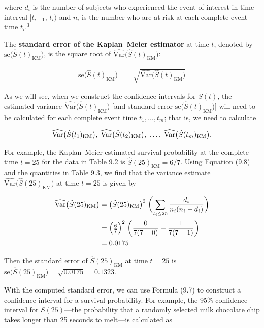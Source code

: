 \documentclass[
]{report}
\begin{document}
where \(d_i\) is the number of subjects who experienced the event of interest in time interval \([t_{i-1},\,t_i)\) and \(n_i\) is the number who are at risk at each complete event time \(t_i\).\(^3\)

The \textbf{standard error of the Kaplan--Meier estimator} at time \(t\), denoted by \(\mathrm{se}\bigl(\hat S(t)_{\mathrm{KM}}\bigr)\), is the square root of \(\widehat{\mathrm{Var}}\bigl(\hat S(t)_{\mathrm{KM}}\bigr)\):

\begin{align}
\mathrm{se}\bigl(\hat S(t)_{\mathrm{KM}}\bigr)
&= \sqrt{\widehat{\mathrm{Var}}\bigl(\hat S(t)_{\mathrm{KM}}\bigr)}
\tag{9.9}
\end{align}

As we will see, when we construct the confidence intervals for \(S(t)\), the estimated variance \(\widehat{\mathrm{Var}}\bigl(\hat S(t)_{\mathrm{KM}}\bigr)\) {[}and standard error \(\mathrm{se}\bigl(\hat S(t)_{\mathrm{KM}}\bigr)\){]} will need to be calculated for each complete event time \(t_1,\dots,t_m\); that is, we need to calculate

\begin{align}
\widehat{\mathrm{Var}}\bigl(\hat S(t_1)_{\mathrm{KM}}\bigr),\;\widehat{\mathrm{Var}}\bigl(\hat S(t_2)_{\mathrm{KM}}\bigr),\;\dots,\;\widehat{\mathrm{Var}}\bigl(\hat S(t_m)_{\mathrm{KM}}\bigr).\notag
\end{align}

For example, the Kaplan--Meier estimated survival probability at the complete time \(t=25\) for the data in Table 9.2 is \(\hat S(25)_{\mathrm{KM}} = 6/7\). Using Equation (9.8) and the quantities in Table 9.3, we find that the variance estimate \(\widehat{\mathrm{Var}}\bigl(\hat S(25)_{\mathrm{KM}}\bigr)\) at time \(t=25\) is given by

\begin{align}
\widehat{\mathrm{Var}}\bigl(\hat S(25)_{\mathrm{KM}}\bigr)
&= \bigl(\hat S(25)_{\mathrm{KM}}\bigr)^2 \;\biggl(\sum_{t_i \le 25}\frac{d_i}{n_i(n_i - d_i)}\biggr) \\
&= \Bigl(\tfrac{6}{7}\Bigr)^2 \;\biggl(\frac{0}{7(7-0)} + \frac{1}{7(7-1)}\biggr) \\
&= 0.0175 
\notag
\end{align}

Then the standard error of \(\hat S(25)_{\mathrm{KM}}\) at time \(t=25\) is \(\mathrm{se}\bigl(\hat S(25)_{\mathrm{KM}}\bigr) = \sqrt{0.0175} = 0.1323\).

With the computed standard error, we can use Formula (9.7) to construct a confidence interval for a survival probability. For example, the 95\% confidence interval for \(S(25)\)---the probability that a randomly selected milk chocolate chip takes longer than 25 seconds to melt---is calculated as
\end{document}
